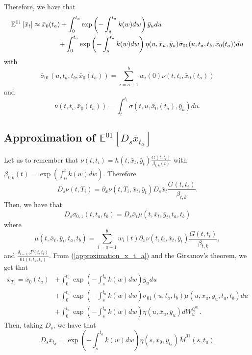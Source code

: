 \documentclass[a4paper,10pt]{article}
\newcommand{\1}{\mathbf{1}}
\begin{document}
Therefore, we have that
\begin{align}
\mathbb{E}^{01}\left[\bar{x}_t\right] &\approx \bar{x}_0(t_a)  + \int_{0}^{t_a} \exp\left(-\int_{s}^{t_a}k(w)dw\right) \bar{y}_u du \nonumber \\ 
&\hspace{1.3cm} + \int_{0}^{t_a} \exp\left(-\int_{s}^{t_a}k(w)dw\right) \eta(u,\bar{x}_u,\bar{y}_u) \bar{\sigma}_{01}(u, t_a, t_b,\bar{x}_0(t_a)) du
\end{align}
with
$$
\bar{\sigma}_{01}(u, t_a, t_b,\bar{x}_0(t_a)) = \sum_{i=a+1}^{b} w_i(0) \nu(t,t_i,\bar{x}_0(t_a))
$$
and
$$
\nu(t,t_i,\bar{x}_0(t_a)) = \int_{t}^{t_i} \sigma(t,u,\bar{x}_0(t_a),\bar{y}_u) du.
$$ 

\subsection{Approximation of $\mathbb{E}^{01}\left[D_s \bar{x}_{t_a} \right]$}\label{approximation_under_annuity_measeure_d_s}
Let us to remember that $\nu(t,t_i)=h(t,\bar{x}_t,\bar{y}_t) \frac{G(t,t_i)}{\beta_{t,k}(t)}$ with  $\beta_{t,k}(t) = \exp\left(\int_{0}^{t}k(w)dw\right)$.
Therefore 
\begin{equation*}
D_s \nu(t,T_i) = \partial_x \nu(t,T_i, \bar{x}_t, \bar{y}_t) D_s \bar{x}_t  \frac{G(t,t_i)}{\beta_{t,k}}.
\end{equation*}
Then, we have that
\begin{equation}
D_s \sigma_{0,1}(t,t_a,t_b) =  D_s \bar{x}_t \mu(t,\bar{x}_t, \bar{y}_t, t_a,t_b)
\end{equation}
where 
$$
\mu(t,\bar{x}_t, \bar{y}_t, t_a,t_b) =  \sum_{i=a+1}^{b} w_i(t) \partial_x \nu(t,t_i, \bar{x}_t, \bar{y}_t) \frac{G(t,t_i)}{\beta_{t,k}},
$$
and $\frac{\delta_{i-1,i} P(t,t_i)}{01(t,t_a,t_b)}$. From (\ref{approximation_x_t_a})  and the Girsanov's theorem, we get that
\begin{align*}
\bar{x}_{T_a} =  \bar{x}_0(t_a)  &+ \int_{0}^{t_a} \exp\left(-\int_{s}^{t_a}k(w)dw\right) \bar{y}_u du \nonumber \\\ 
&+ \int_{0}^{t_a} \exp\left(-\int_{s}^{t_a}k(w)dw\right) \sigma_{01}(u,t_a,t_b) \mu(u,\bar{x}_u, \bar{y}_u, t_a,t_b) du \nonumber \\\
&+  \int_{0}^{t_a}  \exp\left(-\int_{s}^{t_a}k(w)dw \right) \eta(u,\bar{x}_u,\bar{y}_u) dW_u^{\mathbb{Q}^{01}}.
\end{align*}
Then, taking $D_s$, we have that
\begin{equation*}
D_s \bar{x}_{t_a} = \exp\left(-\int_{s}^{t_a}k(w)dw \right) \eta(s,\bar{x}_0,\bar{y}_{t_a})\bar{M}^{01}(s,t_a)
\end{equation*}
\end{document}
